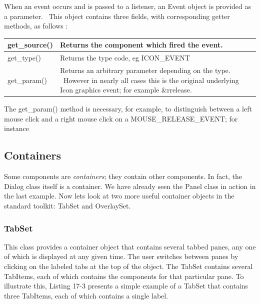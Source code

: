 When an event occurs and is passed to a listener, an \textsf{Event}
object is provided as a parameter. \ This object contains three fields,
with corresponding getter methods, as follows :

\begin{center}
\tablehead{}
\begin{supertabular}{|m{2.9212599in}|m{2.9212599in}|}
\hline
\sffamily\mdseries get\_source() &
Returns the component which fired the event.\\\hline
\sffamily\mdseries get\_type() &
Returns the type code, eg \textsf{ICON\_EVENT}\\\hline
\sffamily\mdseries get\_param() &
Returns an arbitrary parameter depending on the type. \ However in
nearly all cases this is the original underlying Icon graphics event;
for example \textsf{\&rrelease}.\\\hline
\end{supertabular}
\end{center}
The \textsf{get\_param()} method is necessary, for example, to
distinguish between a left mouse click and a right mouse click on a
\textsf{MOUSE\_RELEASE\_EVENT}; for instance 


\subsection{Containers}

Some components are \textit{containers}; they contain other components.
In fact, the \textsf{Dialog} class itself is a container. We have
already seen the \textsf{Panel} class in action in the last example.
Now let{\textquotesingle}s look at two more useful container objects in the standard toolkit: \textsf{TabSet}
and \textsf{OverlaySet}.

\subsubsection[TabSet]{\sffamily TabSet}
This class provides a container object that contains several tabbed panes, any one of which is displayed at any given
time. The user switches between panes by clicking on the labeled tabs
at the top of the object. The \textsf{TabSet} contains several
\textsf{TabItems}, each of which contains the components for that
particular pane. To illustrate this, Listing 17-3 presents a simple
example of a \textsf{TabSet} that contains three \textsf{TabItems},
each of which contains a single label.

